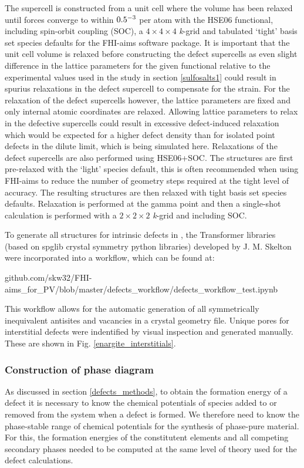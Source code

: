 \documentclass[11pt, twoside]{report}
\begin{document}
The supercell is constructed from a unit cell where the volume has been relaxed until forces converge to within $0.5\time10^{-3}$ per atom with the HSE06 functional, including spin-orbit coupling (SOC), a $4\times4\times4$ \textit{k}-grid and tabulated `tight' basis set species defaults for the FHI-aims software package. It is important that the unit cell volume is relaxed before constructing the defect supercells as even slight difference in the lattice parameters for the given functional relative to the experimental values used in the study in section \ref{sulfosalts1} could result in spurius relaxations in the defect supercell to compensate for the strain.
For the relaxation of the defect supercells however, the lattice parameters are fixed and only internal atomic coordinates are relaxed. Allowing lattice parameters to relax in the defective supercells could result in excessive defect-induced relaxation which would be expected for a higher defect density than for isolated point defects in the dilute limit, which is being simulated here. Relaxations of the defect supercells are also performed using HSE06+SOC. The structures are first pre-relaxed with the `light' species default, this is often recommended when using FHI-aims to reduce the number of geometry steps required at the tight level of accuracy. The resulting structures are then relaxed with tight basis set species defaults. Relaxation is performed at the gamma point and then a single-shot calculation is performed with a $2\times2\times2$ \textit{k}-grid and including SOC.

To generate all structures for intrinsic defects in {\enargite}, the Transformer libraries (based on spglib crystal symmetry python libraries) developed by J. M. Skelton were incorporated into a workflow, which can be found at:

github.com/skw32/FHI-aims\_for\_PV/blob/master/defects\_workflow/defects\_workflow\_test.ipynb

This workflow allows for the automatic generation of all symmetrically inequivalent antisites and vacancies in a crystal geometry file. Unique pores for interstitial defects were indentified by visual inspection and generated manually. These are shown in Fig. \ref{enargite_interstitials}.



\subsubsection{Construction of phase diagram}
As discussed in section \ref{defects_methods}, to obtain the formation energy of a defect it is necessary to know the chemical potentials of species added to or removed from the system when a defect is formed. We therefore need to know the phase-stable range of chemical potentials for the synthesis of phase-pure material. For this, the formation energies of the constitutent elements and all competing secondary phases needed to be computed at the same level of theory used for the defect calculations.
\end{document}
